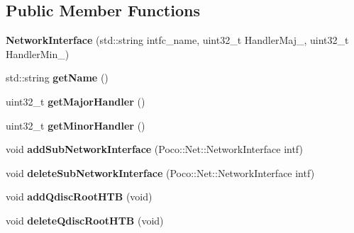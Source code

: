 \subsection*{Public Member Functions}
\begin{DoxyCompactItemize}
\item 
\mbox{\label{classecodtn_1_1net_1_1NetworkInterface_a594c49624551938d58f1c778721afc66}} 
{\bfseries Network\+Interface} (std\+::string intfc\+\_\+name, uint32\+\_\+t Handler\+Maj\+\_\+, uint32\+\_\+t Handler\+Min\+\_\+)
\item 
\mbox{\label{classecodtn_1_1net_1_1NetworkInterface_a711935dd346faea7fe49de76e794b2a0}} 
std\+::string {\bfseries get\+Name} ()
\item 
\mbox{\label{classecodtn_1_1net_1_1NetworkInterface_ade78ecb04ed45000f0a72eac13550d28}} 
uint32\+\_\+t {\bfseries get\+Major\+Handler} ()
\item 
\mbox{\label{classecodtn_1_1net_1_1NetworkInterface_aa7ffda86dc44bf229800d8c57f8f575a}} 
uint32\+\_\+t {\bfseries get\+Minor\+Handler} ()
\item 
\mbox{\label{classecodtn_1_1net_1_1NetworkInterface_a79b9620fd7b6e23e1b4b8116b29cff99}} 
void {\bfseries add\+Sub\+Network\+Interface} (Poco\+::\+Net\+::\+Network\+Interface intf)
\item 
\mbox{\label{classecodtn_1_1net_1_1NetworkInterface_ace1d9bcb9fc4e45d91626a758d554ddc}} 
void {\bfseries delete\+Sub\+Network\+Interface} (Poco\+::\+Net\+::\+Network\+Interface intf)
\item 
\mbox{\label{classecodtn_1_1net_1_1NetworkInterface_a163e4128de30153e342e9e8d2229c2eb}} 
void {\bfseries add\+Qdisc\+Root\+H\+TB} (void)
\item 
\mbox{\label{classecodtn_1_1net_1_1NetworkInterface_aeb9ec7bc95f27a394a8f64aaec41a2e5}} 
void {\bfseries delete\+Qdisc\+Root\+H\+TB} (void)
\item 

\end{DoxyCompactItemize}
